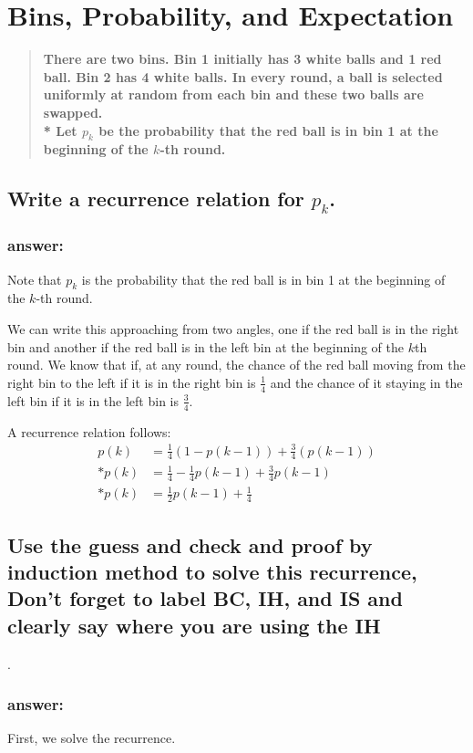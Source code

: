\documentclass[titlepage]{article}
\theoremstyle{definition}
\begin{document}
\section{Bins, Probability, and Expectation}
\begin{quote}
  \textbf{There are two bins. Bin 1 initially has 3 white balls and 1 red ball.
  Bin 2 has 4 white balls. In every round, a ball is selected uniformly at
  random from each bin and these two balls are swapped. \\*
  Let $p_k$ be the probability that the red ball is in bin 1 at the beginning of
  the $k$-th round.}
\end{quote}

\subsection{ Write a recurrence relation for $p_k$. }
  \subsubsection{answer:}
    Note that $p_k$ is the probability that the red ball is in bin 1 at the beginning of
    the $k$-th round.

    We can write this approaching from two angles, one if the red ball is in the
    right bin and another if the red ball is in the left bin at the beginning of
    the $k$th round. 
    We know that if, at any round, the chance of the red ball moving from the right
    bin to the left if it is in the right bin is $\frac{1}{4}$ and the chance of it
    staying in the left bin if it is in the left bin is $\frac{3}{4}$. 

    A recurrence relation follows:
    \begin{align}
      p(k) & = \frac{1}{4}\left(1 - p(k-1)\right) + \frac{3}{4}\left(p\left(k-1\right)\right) \\*
      p(k) & = \frac{1}{4} - \frac{1}{4}p(k-1) + \frac{3}{4}p(k-1) \\*
      p(k) & = \frac{1}{2}p(k-1) + \frac{1}{4} 
    \end{align}


\subsection{Use the guess and check and proof by induction method to solve this
	recurrence, Don't forget to label BC, IH, and IS and clearly say where you
	are using the IH}.
  \subsubsection{answer:}
    First, we solve the recurrence.
\end{document}
